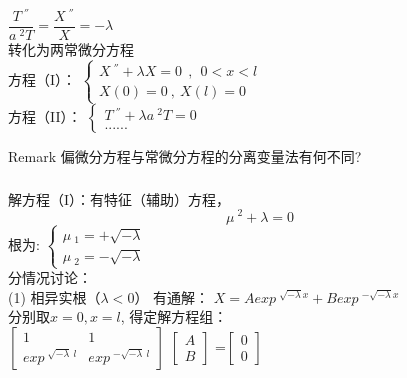 \begin{frame}
	\frametitle{}	
	$ \dfrac{T~^{''}}{a~^2 T}=\dfrac{X~^{''} }{X} =-\lambda $ \\ \vspace{0.3cm}
	转化为两常微分方程 \\ \vspace{0.3cm}
	方程（I）：
	$\displaystyle  \begin{cases}
		X~^{''} +\lambda X=0  ~~,~~ 0<x<l\\
		X(0)=0 ~,~X(l)=0
	\end{cases}$ \\	
	方程（II）：
	$\displaystyle  \begin{cases}
		T~^{''} +\lambda {a~^2 T}=0 \\
		......
	\end{cases}$ \\	
	\begin{block} {Remark}
		偏微分方程与常微分方程的分离变量法有何不同?
	\end{block}
\end{frame}	

\begin{frame}
	\frametitle{}	
	解方程（I）：有特征（辅助）方程， 
	\begin{equation*}
		\mu~^2 +\lambda =0
	\end{equation*}
	根为:
	$\displaystyle  \begin{cases}
		\mu~_1=+\sqrt{-\lambda}\\
		\mu~_2=-\sqrt{-\lambda}
	\end{cases}$ \\		
	分情况讨论：\\
	(1) 相异实根（$\lambda < 0$）
	有通解：	{ $\displaystyle 	X=Aexp~^{\sqrt{-\lambda}x} + Bexp~^{-\sqrt{-\lambda}x} $ } \\ 
	分别取$x=0, x=l$, 得定解方程组：\\
	$\left[
	\begin{array}{lll}
		1&1\\
		exp~^{\sqrt{-\lambda}~l} &exp~^{-\sqrt{-\lambda}~l}
	\end{array}
	\right]$
	$\left[
	\begin{array}{ll}
		A\\
		B
	\end{array}
	\right]$
	=$\left[
	\begin{array}{ll}
		0\\
		0
	\end{array}
	\right]$
\end{frame}	

